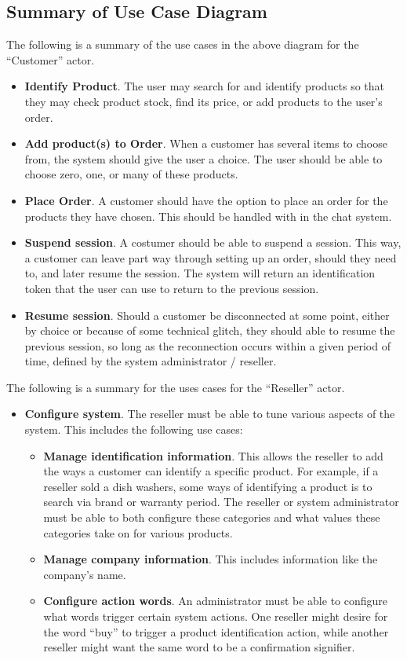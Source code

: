 \documentclass[11pt, titlepage]{article}
\begin{document}
\subsection{Summary of Use Case Diagram}
The following is a summary of the use cases in the above diagram for the
``Customer'' actor.
\begin{itemize}
\item \textbf{Identify Product}.  The user may search for and identify
products so that they may check product stock, find its price, or add products
to the user's order.
\item \textbf{Add product(s) to Order}.  When a customer has several items to
choose from, the system should give the user a choice.  The user should be able
to choose zero, one, or many of these products.
\item \textbf{Place Order}.  A customer should have the option to place an
order for the products they have chosen.  This should be handled with in the
chat system.
\item \textbf{Suspend session}.  A costumer should be able to suspend a session.
This way, a customer can leave part way through setting up an order, should they
need to, and later resume the session.  The system will return an identification
token that the user can use to return to the previous session.
\item \textbf{Resume session}.  Should a customer be disconnected at some point,
either by choice or because of some technical glitch, they should able to
resume the previous session, so long as the reconnection occurs within a given
period of time, defined by the system administrator / reseller.
\end{itemize}
The following is a summary for the uses cases for the ``Reseller'' actor.
\begin{itemize}
\item \textbf{Configure system}.  The reseller must be able to tune various
aspects of the system.  This includes the following use cases:
\begin{itemize}
\item \textbf{Manage identification information}.  This allows the reseller
to add the ways a customer can identify a specific product.  For example,
if a reseller sold a dish washers, some ways of identifying a product is to
search via brand or warranty period.  The reseller or system administrator
must be able to both configure these categories and what values these categories
take on for various products.
\item \textbf{Manage company information}.  This includes information like the
company's name.
\item \textbf{Configure action words}.  An administrator must be able to
configure what words trigger certain system actions.  One reseller might
desire for the word ``buy'' to trigger a product identification action,
while another reseller might want the same word to be a confirmation
signifier.
\end{itemize}
\end{itemize}
\end{document}
